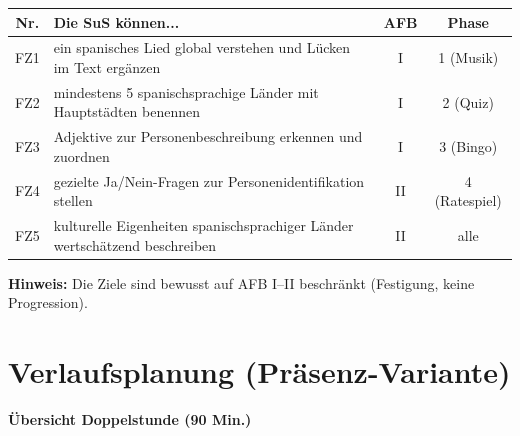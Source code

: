 \documentclass[11pt,a4paper]{article}
\begin{document}
\begin{tabular}{|c|p{7cm}|c|c|}
\hline
\textbf{Nr.} & \textbf{Die SuS können...} & \textbf{AFB} & \textbf{Phase} \\
\hline
FZ1 & ein spanisches Lied global verstehen und Lücken im Text ergänzen & I & 1 (Musik) \\
\hline
FZ2 & mindestens 5 spanischsprachige Länder mit Hauptstädten benennen & I & 2 (Quiz) \\
\hline
FZ3 & Adjektive zur Personenbeschreibung erkennen und zuordnen & I & 3 (Bingo) \\
\hline
FZ4 & gezielte Ja/Nein-Fragen zur Personenidentifikation stellen & II & 4 (Ratespiel) \\
\hline
FZ5 & kulturelle Eigenheiten spanischsprachiger Länder wertschätzend beschreiben & II & alle \\
\hline
\end{tabular}

\vspace{1em}
\textbf{Hinweis:} Die Ziele sind bewusst auf AFB I--II beschränkt (Festigung, keine Progression).

\section{Verlaufsplanung (Präsenz-Variante)}

\textbf{Übersicht Doppelstunde (90 Min.)}
\end{document}
